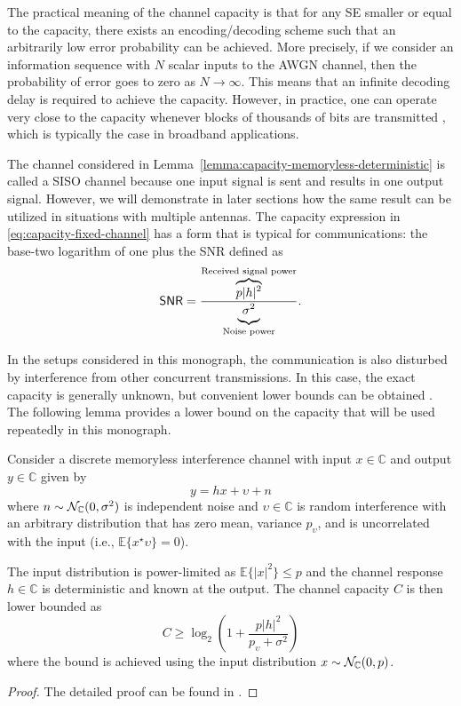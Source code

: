 The practical meaning of the channel capacity is that for any SE smaller or equal to the capacity, there exists an encoding/decoding scheme such that an arbitrarily low error probability can be achieved. More precisely, if we consider an information sequence with $N$ scalar inputs to the \gls{AWGN} channel, then the probability of error goes to zero as $N\to \infty$. This means that an infinite decoding delay is required to achieve the capacity. However, in practice, one can operate very close to the capacity whenever blocks of thousands of bits are transmitted \cite{Bjornson2016b}, which is typically the case in broadband applications.

The channel considered in Lemma~\ref{lemma:capacity-memoryless-deterministic} is called a \gls{SISO} channel because one input signal is sent and results in one output signal. However, we will demonstrate in later sections how the same result can be utilized in situations with multiple antennas. 
The capacity expression in \eqref{eq:capacity-fixed-channel} has a form that is typical for communications: the base-two logarithm of one plus the  \gls{SNR} defined as 
\begin{equation}
\mathsf{SNR} =  \frac{\overbrace{p |h|^2  }^{\textrm{Received signal power}} }{\underbrace{  \vphantom{p |h|^2} \sigma^2}_{\textrm{Noise power}}}.
\end{equation}

In the setups considered in this monograph, the communication is also disturbed by interference from other concurrent transmissions. In this case, the exact capacity is generally unknown, but convenient lower bounds can be obtained \cite{Biglieri1998a}. The following lemma provides a lower bound on the capacity that will be used repeatedly in this monograph.

\begin{lemma} \label{lemma:capacity-memoryless-deterministic-interference} 
Consider a discrete memoryless interference channel  with input $x \in \mathbb{C}$ and output $y \in \mathbb{C}$ given by
\begin{equation} 
y = h x + \upsilon + n
\end{equation}
where $n \sim \mathcal{N}_{\mathbb{C}}(0,\sigma^2)$ is independent noise and $\upsilon\in \mathbb{C}$ is random interference with an arbitrary distribution that has zero mean, variance $p_{\upsilon}$, and is uncorrelated with the input (i.e., $\mathbb{E}\{ x^{\star} \upsilon \} = 0$).

The input distribution is power-limited as $\mathbb{E}\{ |x|^2 \} \leq p$ and the channel response $h \in \mathbb{C}$ is deterministic and known at the output.
The channel capacity $C$ is then lower bounded as
\begin{equation} \label{eq:capacity-fixed-channel-interference}
C \geq \log_2 \left(1+\frac{p |h|^2}{p_{\upsilon} + \sigma^2} \right)
\end{equation}
where the bound is achieved using the input distribution $x \sim \mathcal{N}_{\mathbb{C}}(0,p)$.
\end{lemma}
\begin{proof}
The detailed proof can be found in \cite[App.~C.1.2]{massivemimobook}.
\end{proof}

